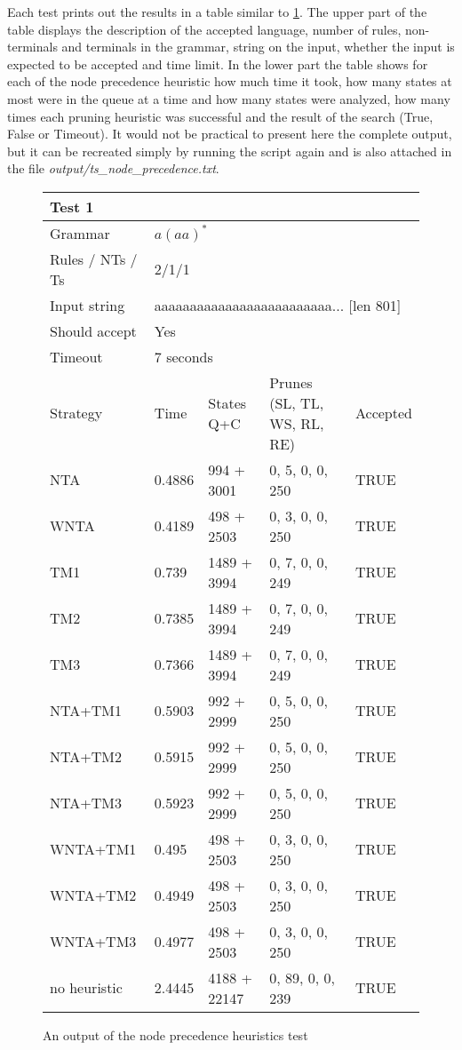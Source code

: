 Each test prints out the results in a table similar to \ref{tab:node_heuristics_table}. The upper part of the table displays the description of the accepted language, number of rules, non-terminals and terminals in the grammar, string on the input, whether the input is expected to be accepted and time limit. In the lower part the table shows for each of the node precedence heuristic how much time it took, how many states at most were in the queue at a time and how many states were analyzed, how many times each pruning heuristic was successful and the result of the search (True, False or Timeout). It would not be practical to present here the complete output, but it can be recreated simply by running the script again and is also attached in the file \textit{output/ts\_node\_precedence.txt}.

\begin{figure}[h]
  \caption{An output of the node precedence heuristics test}
  \label{tab:node_heuristics_table}
\begin{tabular}{ |l|l|l|l|l|  }
  \hline
  \multicolumn{5}{|l|}{Test 1} \\
  \hline
  Grammar & \multicolumn{4}{|l|}{$a(aa)^*$} \\
  Rules / NTs / Ts & \multicolumn{4}{|l|}{2/1/1} \\
  Input string & \multicolumn{4}{|l|}{aaaaaaaaaaaaaaaaaaaaaaaaa... [len 801]} \\
  Should accept & \multicolumn{4}{|l|}{Yes} \\
  Timeout & \multicolumn{4}{|l|}{7 seconds} \\
  \hline
  Strategy & Time & States Q+C & Prunes (SL, TL, WS, RL, RE)& Accepted \\
  \hline
 NTA & 0.4886 & 994 + 3001  & 0, 5, 0, 0, 250 & TRUE \\
 WNTA & 0.4189 & 498 + 2503 & 0, 3, 0, 0, 250 & TRUE  \\
 TM1 & 0.739 & 1489 + 3994 & 0, 7, 0, 0, 249  & TRUE  \\
 TM2 & 0.7385 & 1489 + 3994 & 0, 7, 0, 0, 249 & TRUE  \\
 TM3 & 0.7366 & 1489 + 3994 & 0, 7, 0, 0, 249  & TRUE  \\
 NTA+TM1 & 0.5903 & 992 + 2999 & 0, 5, 0, 0, 250 & TRUE  \\
 NTA+TM2 & 0.5915 & 992 + 2999 & 0, 5, 0, 0, 250 & TRUE  \\
 NTA+TM3 & 0.5923 & 992 + 2999 & 0, 5, 0, 0, 250 & TRUE  \\
 WNTA+TM1 & 0.495 & 498 + 2503 & 0, 3, 0, 0, 250 & TRUE  \\
 WNTA+TM2 & 0.4949 & 498 + 2503 & 0, 3, 0, 0, 250 & TRUE  \\
 WNTA+TM3 & 0.4977 & 498 + 2503 & 0, 3, 0, 0, 250 & TRUE  \\
 no heuristic & 2.4445 & 4188 + 22147 & 0, 89, 0, 0, 239 & TRUE  \\
  \hline
  \hline
\end{tabular}
\end{figure}

